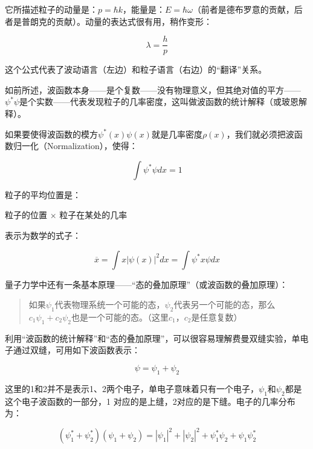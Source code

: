 它所描述粒子的动量是：$p = \hbar k$，能量是：$E = \hbar
\omega$（前者是德布罗意的贡献，后者是普朗克的贡献）。动量的表达式很有用，稍作变形：

\begin{equation}
\lambda = \frac{h}{p}
\end{equation}

这个公式代表了波动语言（左边）和粒子语言（右边）的“翻译”关系。

如前所述，波函数本身——是个复数——没有物理意义，但其绝对值的平方——$\psi^* \psi $是个实数——代表发现粒子的几率密度，这叫做波函数的统计解释（或玻恩解释）。

如果要使得波函数的模方$\psi^*(x) \psi(x)$就是几率密度$\rho(x)$，我们就必须把波函数归一化（Normalization），使得：

\begin{equation}
\int \psi^* \psi dx =1
\end{equation}

粒子的平均位置是：

\begin{center}
粒子的位置 $\times$ 粒子在某处的几率
\end{center}

表示为数学的式子：

\begin{equation}
\overline{x} = \int x | \psi(x) |^2 dx = \int \psi^*  x \psi  d x
\end{equation}

量子力学中还有一条基本原理——“态的叠加原理”（或波函数的叠加原理）：

\begin{quote}
如果$\psi_1$代表物理系统一个可能的态，$\psi_2$代表另一个可能的态，那么$c_1\psi_1 + c_2\psi_2$也是一个可能的态。（这里$c_1$，$c_2$是任意复数）
\end{quote}

利用“波函数的统计解释”和“态的叠加原理”，可以很容易理解费曼双缝实验，单电子通过双缝，可用如下波函数表示：

\begin{equation}
\psi  = \psi_1 +  \psi_2
\end{equation}

这里的1和2并不是表示1、2两个电子，单电子意味着只有一个电子，$\psi_1$和$\psi_2$都是这个电子波函数的一部分，1 对应的是上缝，2对应的是下缝。电子的几率分布为：

\begin{equation}
\left( \psi_1^* + \psi_2^*  \right) \left( \psi_1 + \psi_2  \right) = |\psi_1|^2 + |\psi_2|^2 + \psi_1^*\psi_2 +
\psi_1\psi_2^*
\end{equation}

